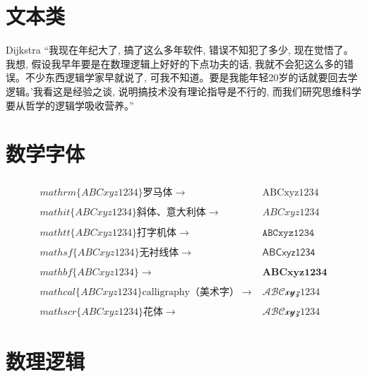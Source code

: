 \documentclass[math,logic,quote,code,mode=simple]{codedumpnote}
\begin{document}
	\frontmatter	%
	
	\mainmatter		%

	

\chapter{文本类}

\begin{pquotation}{Dijkstra}
“我现在年纪大了, 搞了这么多年软件, 错误不知犯了多少, 现在觉悟了。我想, 假设我早年要是在数理逻辑上好好的下点功夫的话, 我就不会犯这么多的错误。不少东西逻辑学家早就说了, 可我不知道。要是我能年轻20岁的话就要回去学逻辑。’我看这是经验之谈, 说明搞技术没有理论指导是不行的, 而我们研究思维科学要从哲学的逻辑学吸收营养。”
\end{pquotation}


\chapter{数学字体}

$$
\begin{aligned}
&\\mathrm\{ABC xyz 1234\}\text{罗马体} \rightarrow & \mathrm{ABC xyz 1234} \\
&\\mathit\{ABC xyz 1234\}\text{斜体、意大利体}  \to & \mathit{ABCxyz1234} \\
&\\mathtt\{ABC xyz 1234\}\text{打字机体}  \to & \mathtt{ABCxyz1234} \\
&\\mathsf\{ABC xyz 1234\}\text{无衬线体}  \to & \mathsf{ABCxyz1234} \\
&\\mathbf\{ABC xyz 1234\} \to & \mathbf{ABCxyz1234} \\
&\\mathcal\{ABC xyz 1234\}\text{calligraphy（美术字）} \to & \mathcal{ABC xyz 1234} \\
&\\mathscr\{ABC xyz 1234\}\text{花体} \to & \mathscr{ABC xyz 1234}
\end{aligned} 	
$$

\chapter{数理逻辑}
\end{document}
